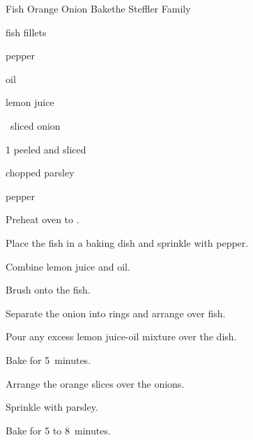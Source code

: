 \begin{recipe}{Fish Orange Onion Bake}{the Steffler Family}{}

\begin{ingredients}
\item \lbs{\half} fish fillets
\item \tp{\quarter} pepper
\item {} oil
\item {} lemon juice
\item \half{}~sliced onion
\item 1 peeled and sliced 
\item {} chopped parsley
\item pepper
\end{ingredients}

\begin{directions}
\item Preheat oven to .
\item Place the fish in a baking dish and sprinkle with pepper.
\item Combine lemon juice and oil.
\item Brush onto the fish.
\item Separate the onion into rings and arrange over fish.
\item Pour any excess lemon juice-oil mixture over the dish.
\item Bake for 5~minutes.
\item Arrange the orange slices over the onions.
\item Sprinkle with parsley.
\item Bake for 5 to 8~minutes.
\end{directions}
\end{recipe}

